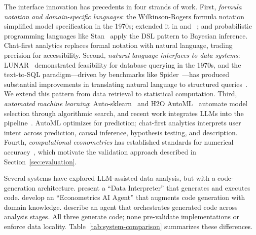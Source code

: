The interface innovation has precedents in four strands of work.
First, \emph{formula notation and domain-specific languages}:
the Wilkinson-Rogers formula notation~\citep{Wilkinson+Rogers:1973}
simplified model specification in the 1970s;
\citet{Chambers+Hastie:1992} extended it in  and
~\citep{Chambers:1998}; and probabilistic programming
languages like Stan~\citep{Carpenter+etal:2017} apply the DSL
pattern to Bayesian inference. Chat-first analytics replaces
formal notation with natural language, trading precision for
accessibility.
Second, \emph{natural language interfaces to data systems}:
LUNAR~\citep{Woods:1973} demonstrated feasibility for database
querying in the 1970s, and the text-to-SQL paradigm---driven by
benchmarks like Spider~\citep{Yu+etal:2018}---has produced
substantial improvements in translating natural language to
structured queries~\citep{Li+etal:2024}. We extend this pattern
from data retrieval to statistical computation.
Third, \emph{automated machine learning}: Auto-sklearn~\citep{Feurer+etal:2015}
and H2O AutoML~\citep{LeDell+Poirier:2020} automate model selection
through algorithmic search, and recent work integrates LLMs into
the pipeline~\citep{Hollmann+etal:2023}. AutoML optimizes for
prediction; chat-first analytics interprets user intent across
prediction, causal inference, hypothesis testing, and description.
Fourth, \emph{computational econometrics} has established
standards for numerical accuracy~\citep{McCullough:1998,
McCullough+Vinod:1999, Davidson+MacKinnon:2004}, which motivate
the validation approach described in Section~\ref{sec:evaluation}.

Several systems have explored LLM-assisted data analysis, but with
a code-generation architecture. \citet{Hong+etal:2024} present a
``Data Interpreter'' that generates and executes 
code. \citet{Chen+etal:2025} develop an ``Econometrics AI Agent''
that augments code generation with domain knowledge.
\citet{Sun+etal:2025:LAMBDA} describe an agent that orchestrates
generated code across analysis stages. All three generate code;
none pre-validate implementations or enforce data locality.
Table~\ref{tab:system-comparison} summarizes these differences.


